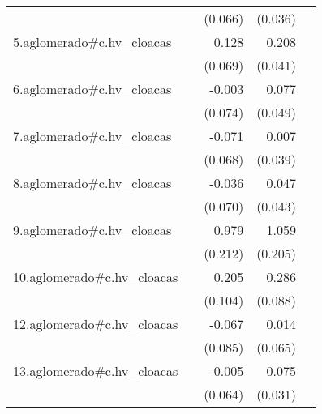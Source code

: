 {\begin{longtable}{l*{4}{D{.}{.}{-1}}}
            &                     &     (0.066)         &     (0.036)         &                     \\
\addlinespace
5.aglomerado#c.hv\_cloacas&                     &       0.128         &       0.208\sym{***}&                     \\
            &                     &     (0.069)         &     (0.041)         &                     \\
\addlinespace
6.aglomerado#c.hv\_cloacas&                     &      -0.003         &       0.077         &                     \\
            &                     &     (0.074)         &     (0.049)         &                     \\
\addlinespace
7.aglomerado#c.hv\_cloacas&                     &      -0.071         &       0.007         &                     \\
            &                     &     (0.068)         &     (0.039)         &                     \\
\addlinespace
8.aglomerado#c.hv\_cloacas&                     &      -0.036         &       0.047         &                     \\
            &                     &     (0.070)         &     (0.043)         &                     \\
\addlinespace
9.aglomerado#c.hv\_cloacas&                     &       0.979\sym{***}&       1.059\sym{***}&                     \\
            &                     &     (0.212)         &     (0.205)         &                     \\
\addlinespace
10.aglomerado#c.hv\_cloacas&                     &       0.205\sym{*}  &       0.286\sym{**} &                     \\
            &                     &     (0.104)         &     (0.088)         &                     \\
\addlinespace
12.aglomerado#c.hv\_cloacas&                     &      -0.067         &       0.014         &                     \\
            &                     &     (0.085)         &     (0.065)         &                     \\
\addlinespace
13.aglomerado#c.hv\_cloacas&                     &      -0.005         &       0.075\sym{*}  &                     \\
            &                     &     (0.064)         &     (0.031)         &                     \\

\end{longtable}}

